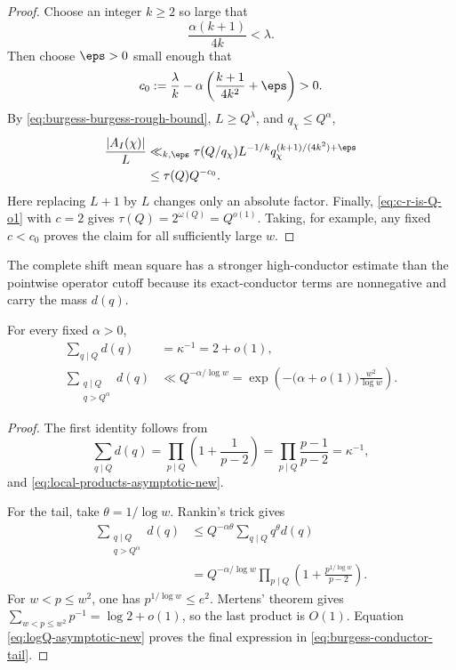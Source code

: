\begin{proof}
Choose an integer $k\ge2$ so large that
\begin{equation}\label{eq:burgess-k-choice}
 \frac{\alpha(k+1)}{4k}<\lambda.
\end{equation}
Then choose $\eps>0$ small enough that
\[
 c_0:=\frac\lambda k
 -\alpha\left(\frac{k+1}{4k^2}+\eps\right)>0.
\]
By \eqref{eq:burgess-burgess-rough-bound}, $L\ge Q^\lambda$, and
$q_\chi\le Q^\alpha$,
\begin{align*}
 \frac{|A_I(\chi)|}{L}
 &\ll_{k,\eps}
 \tau(Q/q_\chi)L^{-1/k}
 q_\chi^{(k+1)/(4k^2)+\eps}\\
 &\le \tau(Q)Q^{-c_0}.
\end{align*}
Here replacing $L+1$ by $L$ changes only an absolute factor.  Finally,
\eqref{eq:c-r-is-Q-o1} with $c=2$ gives
$\tau(Q)=2^{\omega(Q)}=Q^{o(1)}$.  Taking, for example, any fixed
$c<c_0$ proves the claim for all sufficiently large $w$.
\end{proof}

The complete shift mean square has a stronger high-conductor estimate than
the pointwise operator cutoff because its exact-conductor terms are
nonnegative and carry the mass $d(q)$.

\begin{lemma}
\label{lem:burgess-conductor-mass-tail}
For every fixed $\alpha>0$,
\begin{align}
 \sum_{q\mid Q}d(q)&=\kappa^{-1}=2+o(1),
 \label{eq:burgess-total-conductor-mass}\\
 \sum_{\substack{q\mid Q\\q>Q^\alpha}}d(q)
 &\ll Q^{-\alpha/\log w}
 =\exp\left(-\bigl(\alpha+o(1)\bigr)
                  \frac{w^2}{\log w}\right).
 \label{eq:burgess-conductor-tail}
\end{align}
\end{lemma}

\begin{proof}
The first identity follows from
\[
 \sum_{q\mid Q}d(q)
 =\prod_{p\mid Q}\left(1+\frac1{p-2}\right)
 =\prod_{p\mid Q}\frac{p-1}{p-2}=\kappa^{-1},
\]
and \eqref{eq:local-products-asymptotic-new}.

For the tail, take $\theta=1/\log w$.  Rankin's trick gives
\begin{align*}
 \sum_{\substack{q\mid Q\\q>Q^\alpha}}d(q)
 &\le Q^{-\alpha\theta}
 \sum_{q\mid Q}q^\theta d(q)\\
 &=Q^{-\alpha/\log w}
   \prod_{p\mid Q}\left(1+\frac{p^{1/\log w}}{p-2}\right).
\end{align*}
For $w<p\le w^2$, one has $p^{1/\log w}\le e^2$.  Mertens' theorem gives
$\sum_{w<p\le w^2}p^{-1}=\log2+o(1)$, so the last product is $O(1)$.
Equation \eqref{eq:logQ-asymptotic-new} proves the final expression in
\eqref{eq:burgess-conductor-tail}.
\end{proof}


